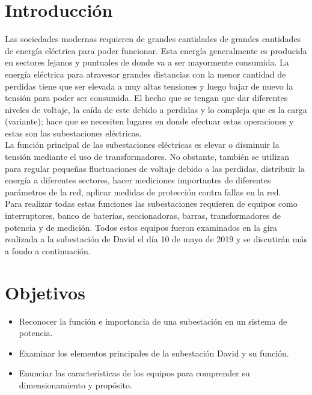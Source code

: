\documentclass[11pt, Spanish]{article}
\begin{document}
\section{Introducción}

Las sociedades modernas requieren de grandes cantidades de grandes cantidades de energía eléctrica para poder funcionar. Esta energía generalmente es producida en sectores lejanos y puntuales de donde va a ser mayormente consumida.  La energía eléctrica para atravesar grandes distancias con la menor cantidad de perdidas tiene que ser elevada a muy altas tensiones y luego bajar de nuevo la tensión para poder ser consumida. El hecho que se tengan que dar diferentes niveles de voltaje, la caída de este debido a perdidas y lo compleja que es la carga (variante); hace que se necesiten lugares en donde efectuar estas operaciones y estas son las subestaciones eléctricas.  \\

La función principal de las subestaciones eléctricas es elevar o disminuir la tensión mediante el uso de transformadores. No obstante, también se utilizan para regular pequeñas fluctuaciones de voltaje debido a las perdidas, distribuir la energía a diferentes sectores, hacer mediciones importantes de diferentes parámetros de la red, aplicar medidas de protección contra fallas en la red. \\

Para realizar todas estas funciones las subestaciones requieren de equipos como interruptores, banco de baterías, seccionadoras, barras, transformadores de potencia y de medición. Todos estos equipos fueron examinados en la gira realizada a la subestación de David el día 10 de mayo de 2019 y se discutirán más a fondo a continuación. 

\section{Objetivos}

\begin{itemize}

    \item Reconocer la función e importancia de una subestación en un sistema de potencia. 
    \item Examinar los elementos principales de la subestación David y su función.  
    \item Enunciar las características de los equipos para comprender su dimensionamiento y propósito.  

\end{itemize}
\end{document}
